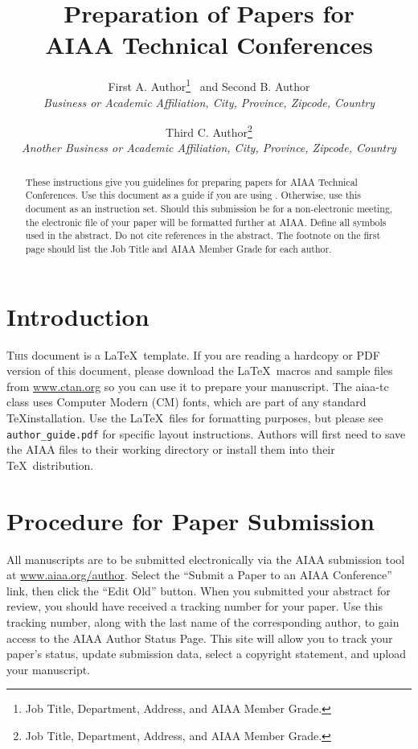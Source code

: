 \documentclass{aiaa-tc}%
\title{Preparation of Papers for\\
        AIAA Technical Conferences}
\author{%
  First A. Author\thanks{Job Title, Department, Address, and AIAA
                              Member Grade.}
  \ and
  Second B. Author\thanksibid{1}\\%
  {\normalsize\itshape
   Business or Academic Affiliation, City, Province, Zipcode, Country}\\
  \and
  Third C. Author\thanks{Job Title, Department, Address, and AIAA
                              Member Grade.}\\
  {\normalsize\itshape
   Another Business or Academic Affiliation, City, Province, Zipcode, Country}
 }
\newcommand{\cls}[1]{\textsf{#1}}
\newcommand{\file}[1]{\texttt{#1}}
\begin{document}
\maketitle

\begin{abstract}
These instructions give you guidelines for preparing papers for AIAA
Technical Conferences.
Use this document as a guide if you are using \LaTeXe.
Otherwise, use this document as an instruction set.
Should this submission be for a non-electronic meeting, the electronic
file of your paper will be formatted further at AIAA.
Define all symbols used in the abstract.
Do not cite references in the abstract.
The footnote on the first page should list the Job Title and AIAA Member
Grade for each author.
\end{abstract}

\printglossary%

\section{Introduction}

\lettrine[nindent=0pt]{T}{his} document is a \LaTeX\ template.
If you are reading a hardcopy or PDF version of this document, please
download the \LaTeX\ macros and sample files from
\href{http://www.ctan.org/}{www.ctan.org}
so you can use it to prepare your manuscript.
The \cls{aiaa-tc} class uses Computer Modern (CM) fonts, which
are part of any standard \TeX installation.
Use the \LaTeX\ files for formatting purposes,
but please see \file{author\_guide.pdf} for specific layout instructions.
Authors will first need to save the \cls{AIAA} files to their
working directory or install them into their \TeX\ distribution.

\section{Procedure for Paper Submission}

All manuscripts are to be submitted electronically via the AIAA
submission tool at \href{http://www.aiaa.org/author}{www.aiaa.org/author}.
Select the ``Submit a Paper to an AIAA Conference'' link, then click the
``Edit Old'' button.
When you submitted your abstract for review, you should have received a
tracking number for your paper.
Use this tracking number, along with the last name of the corresponding
author, to gain access to the AIAA Author Status Page.
This site will allow you to track your paper's status, update submission
data, select a copyright statement, and upload your manuscript.
\end{document}
